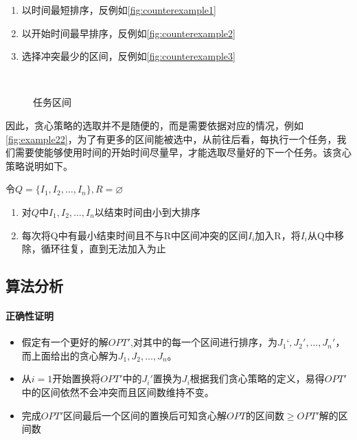 \begin{enumerate}
	\item 以时间最短排序，反例如\autoref{fig:counterexample1}
	\item 以开始时间最早排序，反例如\autoref{fig:counterexample2}
	\item 选择冲突最少的区间，反例如\autoref{fig:counterexample3}
\end{enumerate}


\\
\begin{figure}[hbt!]
		\centering
	\caption{任务区间}\label{fig:example22}
\end{figure}
\newpage
因此，贪心策略的选取并不是随便的，而是需要依据对应的情况，例如\autoref{fig:example22}，为了有更多的区间能被选中，从前往后看，每执行一个任务，我们需要使能够使用时间的开始时间尽量早，才能选取尽量好的下一个任务。该贪心策略说明如下。

令$Q=\{I_1, I_2, \ldots, I_n\},R=\varnothing$

\begin{enumerate}
    \item 对$Q$中$I_1, I_2, \ldots, I_n$以结束时间由小到大排序
    \item 每次将Q中有最小结束时间且不与R中区间冲突的区间$I_i$加入R，将$I_i$从Q中移除，循环往复，直到无法加入为止
\end{enumerate}

\subsection{算法分析}
\paragraph*{正确性证明}
\begin{itemize}
    \item 假定有一个更好的解$OPT'$,对其中的每一个区间进行排序，为$J_1‘,J_2',\ldots,J_n'$，而上面给出的贪心解为$J_1,J_2,\ldots,J_n$。
    \item 从$i=1$开始置换将$OPT'$中的$J_i'置换为J_i$根据我们贪心策略的定义，易得$OPT'$中的区间依然不会冲突而且区间数维持不变。
    \item 完成$OPT'$区间最后一个区间的置换后可知贪心解$OPT$的区间数$\geq OPT'$解的区间数
\end{itemize}


